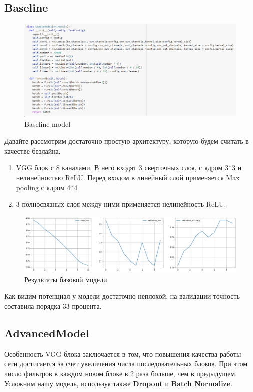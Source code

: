 \documentclass[a4paper,12pt]{article}
\begin{document}
	\subsection{Baseline}
		
	\begin{figure}[H]
		\centering
		\includegraphics[width=1\linewidth]{Image/Simple_model}
		\caption{Baseline model}
		\label{fig:simplemodel}
	\end{figure}

	
	Давайте рассмотрим достаточно простую архитектуру, которую будем считать в качестве безлайна. 
	\begin{enumerate}
		\item VGG блок с 8 каналами. В него входят 3 сверточных слоя, с ядром 3*3 и нелинейностью ReLU. Перед входом в линейный слой применяется Max pooling с ядром 4*4
		\item 3 полносвязных слоя между ними применяется нелинейность ReLU.		
	\end{enumerate}
		\begin{figure}[H]
		\centering
		\includegraphics[width=1.2\linewidth]{Image/Baseline_train.png}
		\caption{Результаты базовой модели}
		\label{fig:featurizer1}
	\end{figure}
	Как видим потенциал у модели достаточно неплохой, на валидации точность составила порядка 33 процента. 
	\subsection{AdvancedModel}
		Особенность VGG блока заключается в том, что повышения качества работы сети достигается за счет увеличения числа последовательных блоков. При этом число фильтров в каждом новом блоке в 2 раза больше, чем в предыдущем. Усложним нашу модель, используя также \textbf{Dropout} и \textbf{Batch Normalize}.
		
\end{document}
